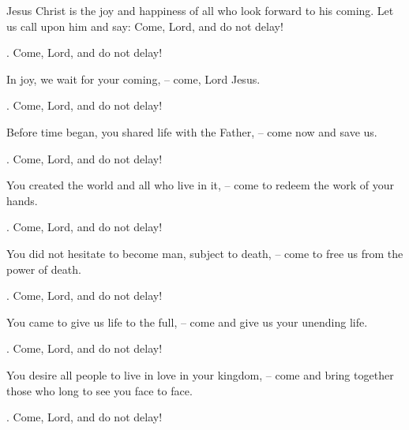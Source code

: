 \lettrine[loversize=0.15,lines=2]{J}{}esus Christ is the joy and happiness of all who look forward to his coming. Let us call upon him and say: Come, Lord, and do not delay!
\par \Rbar. Come, Lord, and do not delay!

In joy, we wait for your coming,
– come, Lord Jesus.
\par \Rbar. Come, Lord, and do not delay!

Before time began, you shared life with the Father,
– come now and save us.
\par \Rbar. Come, Lord, and do not delay!

You created the world and all who live in it,
– come to redeem the work of your hands.
\par \Rbar. Come, Lord, and do not delay!

You did not hesitate to become man, subject to death,
– come to free us from the power of death.
\par \Rbar. Come, Lord, and do not delay!

You came to give us life to the full,
– come and give us your unending life.
\par \Rbar. Come, Lord, and do not delay!

You desire all people to live in love in your kingdom,
– come and bring together those who long to see you face to face.
\par \Rbar. Come, Lord, and do not delay!
